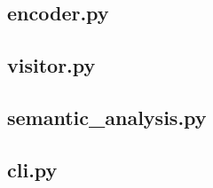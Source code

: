 \documentclass[a4paper,8pt]{article}
\begin{document}
\subsection{encoder.py}
\begin{small}
  
\end{small}
\newpage
\subsection{visitor.py}
\begin{small}
  
\end{small}
\newpage
\subsection{semantic\_analysis.py}
\begin{small}
  
\end{small}
\newpage
\subsection{cli.py}
\begin{small}
  
\end{small}
\newpage
\end{document}
